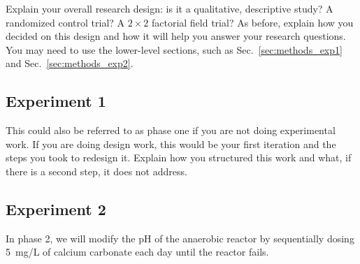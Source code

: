 Explain your overall research design: is it a qualitative, descriptive study? A randomized control trial? A $2 \times 2$ factorial field trial? As before, explain how you decided on this design and how it will help you answer your research questions. You may need to use the lower-level sections, such as Sec.~\ref{sec:methods_exp1} and Sec.~\ref{sec:methods_exp2}.

\subsection{\label{sec:methods_exp1}Experiment 1}

This could also be referred to as phase one if you are not doing experimental work. If you are doing design work, this would be your first iteration and the steps you took to redesign it. Explain how you structured this work and what, if there is a second step, it does not address.

\subsection{\label{sec:methods_exp2}Experiment 2}

In phase 2, we will modify the pH of the anaerobic reactor by sequentially dosing 5~mg/L of calcium carbonate each day until the reactor fails.